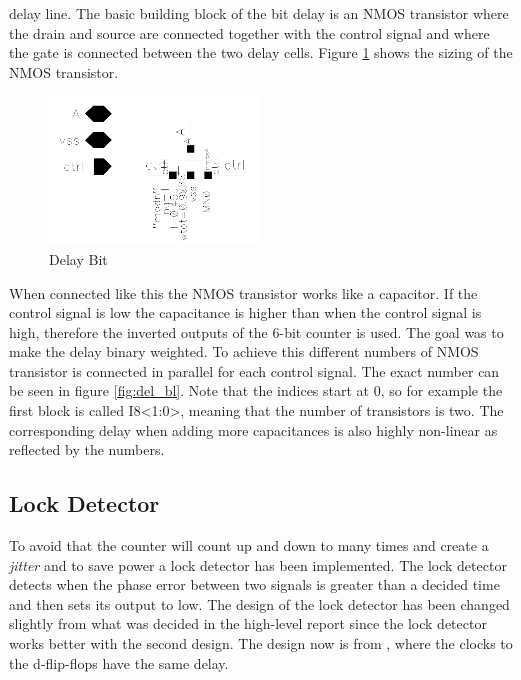 \documentclass[a4paper,12pt]{article} \usepackage{graphicx}
\begin{document}
delay line. 
The basic building block of the
bit delay is an NMOS transistor where the drain and source are connected
together with the control signal and where the gate is connected between the two
delay cells. Figure \ref{fig:del_bit} shows the sizing of the NMOS transistor.
\begin{figure}[h]
        \centering
        \includegraphics[width=0.5\textwidth]{../Bilder/Delay_Line/Delay_bit.png}
        \caption{Delay Bit}
        \label{fig:del_bit}
\end{figure}
When connected like this the NMOS transistor works like a capacitor. If the control
signal is low the capacitance is higher than when the control signal is high,
therefore the inverted outputs of the 6-bit counter is used. The goal was to
make the delay binary weighted. To achieve this different numbers of NMOS
transistor is connected in parallel for each control signal. The exact number
can be seen in figure \ref{fig:del_bl}. Note that the indices start at 0, so for
example the first block is called I8<1:0>, meaning that the number of
transistors is two. The corresponding delay when adding more capacitances is
also highly non-linear as reflected by the numbers.

\clearpage

\subsection{Lock Detector}
\label{sec:lck_det}
To avoid that the counter will count up and down to many times and
create a \emph{jitter} and to save power a lock detector has been implemented. The
lock detector detects when the phase error between two signals is
greater than a decided time and then sets its output to low. The
design of the lock detector has been changed slightly from what was
decided in the high-level report since the lock detector works better
with the second design. The design now is from \cite{dll_report},
where the clocks to the d-flip-flops have the same delay. 
\end{document}
